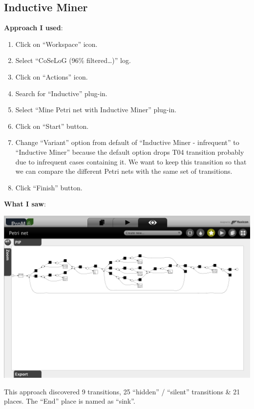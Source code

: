 \documentclass[]{article}
\begin{document}
\subsection{Inductive Miner}\label{inductive-miner}

\textbf{Approach I used}:

\begin{enumerate}
\def\labelenumi{\arabic{enumi}.}
\itemsep1pt\parskip0pt
\item
  Click on ``Workspace'' icon.
\item
  Select ``CoSeLoG (96\% filtered\ldots{})'' log.
\item
  Click on ``Actions'' icon.
\item
  Search for ``Inductive'' plug-in.
\item
  Select ``Mine Petri net with Inductive Miner'' plug-in.
\item
  Click on ``Start'' button.
\item
  Change ``Variant'' option from default of ``Inductive Miner -
  infrequent'' to ``Inductive Miner'' because the default option drops
  T04 transition probably due to infrequent cases containing it. We want
  to keep this transition so that we can compare the different Petri
  nets with the same set of transitions.
\item
  Click ``Finish'' button.
\end{enumerate}

\textbf{What I saw}:

\includegraphics{CoSeLoG_Step_05_Filter96_PetriNet_Inductive.png}

This approach discovered 9 transitions, 25 ``hidden'' / ``silent''
transitions \& 21 places. The ``End'' place is named as ``sink''.
\end{document}
